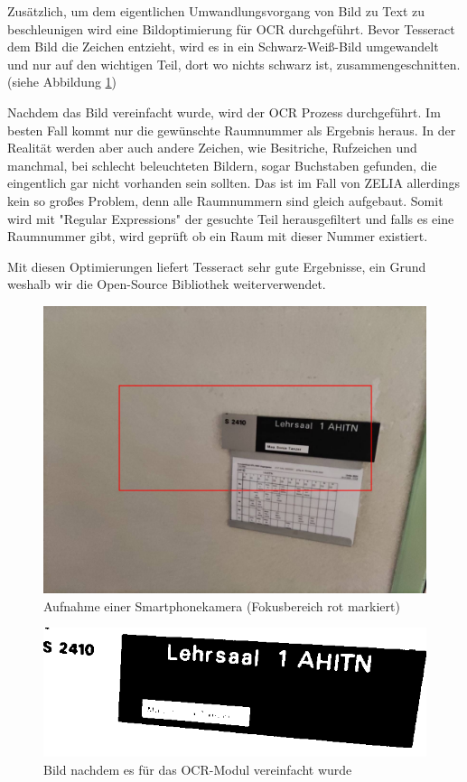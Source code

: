 Zusätzlich, um dem eigentlichen Umwandlungsvorgang von Bild zu Text zu beschleunigen wird eine Bildoptimierung für OCR durchgeführt. Bevor Tesseract dem Bild die Zeichen entzieht, wird es in ein Schwarz-Weiß-Bild umgewandelt und nur auf den wichtigen Teil, dort wo nichts schwarz ist, zusammengeschnitten. (siehe Abbildung \ref{ocroptimised})

Nachdem das Bild vereinfacht wurde, wird der OCR Prozess durchgeführt. Im besten Fall kommt nur die gewünschte Raumnummer als Ergebnis heraus. In der Realität werden aber auch andere Zeichen, wie Besitriche, Rufzeichen und manchmal, bei schlecht beleuchteten Bildern, sogar Buchstaben gefunden, die eingentlich gar nicht vorhanden sein sollten. Das ist im Fall von ZELIA allerdings kein so großes Problem, denn alle Raumnummern sind gleich aufgebaut. Somit wird mit "Regular Expressions" der gesuchte Teil herausgefiltert und falls es eine Raumnummer gibt, wird geprüft ob ein Raum mit dieser Nummer existiert.

Mit diesen Optimierungen liefert Tesseract sehr gute Ergebnisse, ein Grund weshalb wir die Open-Source Bibliothek weiterverwendet.


\begin{figure}
    \centering
    \includegraphics[width=120mm]{media/OCR/original}
    \caption{Aufnahme einer Smartphonekamera (Fokusbereich rot markiert)}
\end{figure}


\begin{figure}
    \centering
    \includegraphics[width=120mm]{media/OCR/compressed}
    \caption{Bild nachdem es für das OCR-Modul vereinfacht wurde}
    \label{ocroptimised}
\end{figure}




